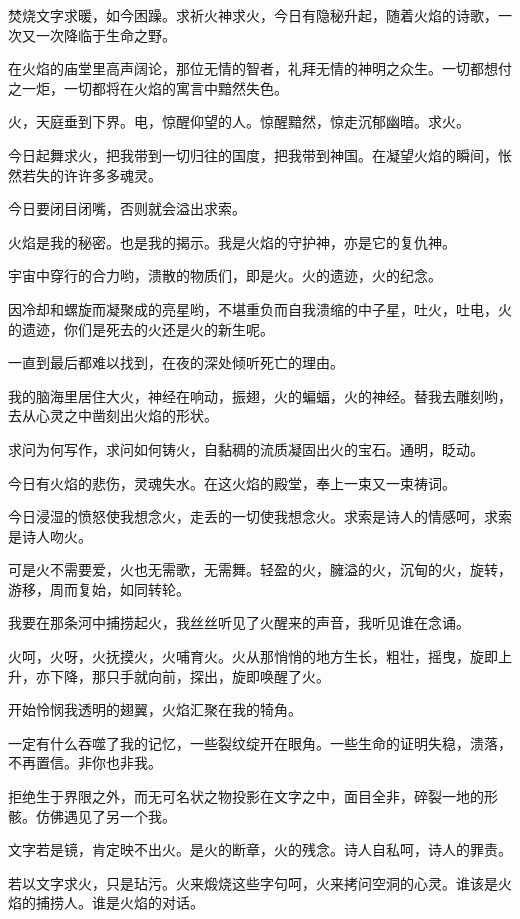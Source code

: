 \documentclass[UTF8]{article}
\begin{document}
\par 焚烧文字求暖，如今困躁。求祈火神求火，今日有隐秘升起，随着火焰的诗歌，一次又一次降临于生命之野。
\par 在火焰的庙堂里高声阔论，那位无情的智者，礼拜无情的神明之众生。一切都想付之一炬，一切都将在火焰的寓言中黯然失色。
\par 火，天庭垂到下界。电，惊醒仰望的人。惊醒黯然，惊走沉郁幽暗。求火。
\par 今日起舞求火，把我带到一切归往的国度，把我带到神国。在凝望火焰的瞬间，怅然若失的许许多多魂灵。
\par 今日要闭目闭嘴，否则就会溢出求索。
\par 火焰是我的秘密。也是我的揭示。我是火焰的守护神，亦是它的复仇神。
\par 宇宙中穿行的合力哟，溃散的物质们，即是火。火的遗迹，火的纪念。
\par 因冷却和螺旋而凝聚成的亮星哟，不堪重负而自我溃缩的中子星，吐火，吐电，火的遗迹，你们是死去的火还是火的新生呢。
\par 一直到最后都难以找到，在夜的深处倾听死亡的理由。
\par 我的脑海里居住大火，神经在响动，振翅，火的蝙蝠，火的神经。替我去雕刻哟，去从心灵之中凿刻出火焰的形状。
\par 求问为何写作，求问如何铸火，自黏稠的流质凝固出火的宝石。通明，眨动。
\par 今日有火焰的悲伤，灵魂失水。在这火焰的殿堂，奉上一束又一束祷词。
\par 今日浸湿的愤怒使我想念火，走丢的一切使我想念火。求索是诗人的情感呵，求索是诗人吻火。
\par 可是火不需要爱，火也无需歌，无需舞。轻盈的火，臃溢的火，沉甸的火，旋转，游移，周而复始，如同转轮。
\par 我要在那条河中捕捞起火，我丝丝听见了火醒来的声音，我听见谁在念诵。
\par 火呵，火呀，火抚摸火，火哺育火。火从那悄悄的地方生长，粗壮，摇曳，旋即上升，亦下降，那只手就向前，探出，旋即唤醒了火。
\\[0.6cm]
\par 开始怜悯我透明的翅翼，火焰汇聚在我的犄角。
\par 一定有什么吞噬了我的记忆，一些裂纹绽开在眼角。一些生命的证明失稳，溃落，不再置信。非你也非我。
\par 拒绝生于界限之外，而无可名状之物投影在文字之中，面目全非，碎裂一地的形骸。仿佛遇见了另一个我。
\par 文字若是镜，肯定映不出火。是火的断章，火的残念。诗人自私呵，诗人的罪责。
\par 若以文字求火，只是玷污。火来煅烧这些字句呵，火来拷问空洞的心灵。谁该是火焰的捕捞人。谁是火焰的对话。
\end{document}
